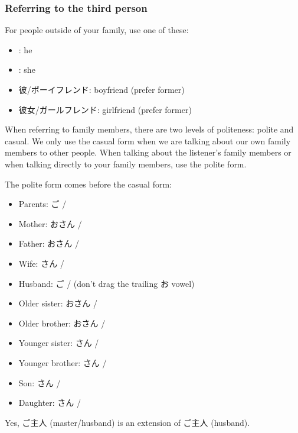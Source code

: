 \documentclass[../nihongo-gakushuu-kyouzai-grammar.tex]{subfiles}
\begin{document}
\subsubsection{Referring to the third person}
For people outside of your family, use one of these:
\begin{itemize}
    \item {}: he
    \item {}: she
    \item 彼/ボーイフレンド: boyfriend (prefer former)
    \item 彼女/ガールフレンド: girlfriend (prefer former)
\end{itemize}

When referring to family members, there are two levels of politeness: polite and casual. We only use the casual form when we are talking about our own family members to other people. When talking about the listener's family members or when talking directly to your family members, use the polite form.

The polite form comes before the casual form:
\begin{itemize}
    \item Parents: ご / 
    \item Mother: おさん / 
    \item Father: おさん / 
    \item Wife: さん / 
    \item Husband: ご /  (don't drag the trailing お vowel)
    \item Older sister: おさん / 
    \item Older brother: おさん / 
    \item Younger sister: さん / 
    \item Younger brother: さん / 
    \item Son: さん / 
    \item Daughter: さん / 
\end{itemize}
Yes, ご主人 (master/husband) is an extension of ご主人 (husband).
\end{document}
